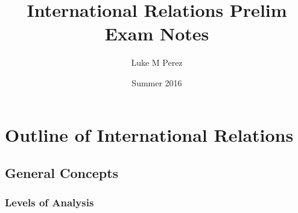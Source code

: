 \documentclass[11pt]{article}
\author{Luke M Perez}
\date{Summer 2016}
\title{International Relations Prelim Exam Notes}
\begin{document}
\maketitle



\section{Outline of International Relations}
\label{sec-1}
\subsection{General Concepts}
\label{sec-1-1}
\subsubsection{Levels of Analysis}
\label{sec-1-1-1}
\end{document}

